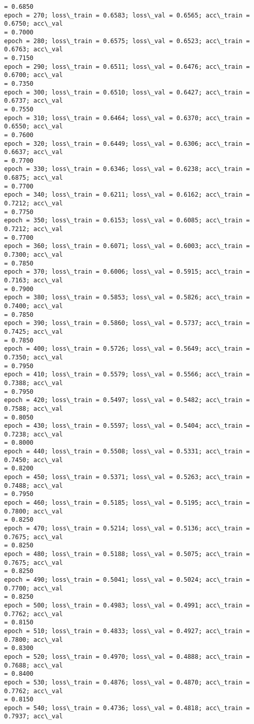 \documentclass[10pt]{article}
\begin{document}
\begin{Verbatim}[commandchars=\\\{\}]
= 0.6850
epoch = 270; loss\_train = 0.6583; loss\_val = 0.6565; acc\_train = 0.6750; acc\_val
= 0.7000
epoch = 280; loss\_train = 0.6575; loss\_val = 0.6523; acc\_train = 0.6763; acc\_val
= 0.7150
epoch = 290; loss\_train = 0.6511; loss\_val = 0.6476; acc\_train = 0.6700; acc\_val
= 0.7350
epoch = 300; loss\_train = 0.6510; loss\_val = 0.6427; acc\_train = 0.6737; acc\_val
= 0.7550
epoch = 310; loss\_train = 0.6464; loss\_val = 0.6370; acc\_train = 0.6550; acc\_val
= 0.7600
epoch = 320; loss\_train = 0.6449; loss\_val = 0.6306; acc\_train = 0.6637; acc\_val
= 0.7700
epoch = 330; loss\_train = 0.6346; loss\_val = 0.6238; acc\_train = 0.6875; acc\_val
= 0.7700
epoch = 340; loss\_train = 0.6211; loss\_val = 0.6162; acc\_train = 0.7212; acc\_val
= 0.7750
epoch = 350; loss\_train = 0.6153; loss\_val = 0.6085; acc\_train = 0.7212; acc\_val
= 0.7700
epoch = 360; loss\_train = 0.6071; loss\_val = 0.6003; acc\_train = 0.7300; acc\_val
= 0.7850
epoch = 370; loss\_train = 0.6006; loss\_val = 0.5915; acc\_train = 0.7163; acc\_val
= 0.7900
epoch = 380; loss\_train = 0.5853; loss\_val = 0.5826; acc\_train = 0.7400; acc\_val
= 0.7850
epoch = 390; loss\_train = 0.5860; loss\_val = 0.5737; acc\_train = 0.7425; acc\_val
= 0.7850
epoch = 400; loss\_train = 0.5726; loss\_val = 0.5649; acc\_train = 0.7350; acc\_val
= 0.7950
epoch = 410; loss\_train = 0.5579; loss\_val = 0.5566; acc\_train = 0.7388; acc\_val
= 0.7950
epoch = 420; loss\_train = 0.5497; loss\_val = 0.5482; acc\_train = 0.7588; acc\_val
= 0.8050
epoch = 430; loss\_train = 0.5597; loss\_val = 0.5404; acc\_train = 0.7238; acc\_val
= 0.8000
epoch = 440; loss\_train = 0.5508; loss\_val = 0.5331; acc\_train = 0.7450; acc\_val
= 0.8200
epoch = 450; loss\_train = 0.5371; loss\_val = 0.5263; acc\_train = 0.7488; acc\_val
= 0.7950
epoch = 460; loss\_train = 0.5185; loss\_val = 0.5195; acc\_train = 0.7800; acc\_val
= 0.8250
epoch = 470; loss\_train = 0.5214; loss\_val = 0.5136; acc\_train = 0.7675; acc\_val
= 0.8250
epoch = 480; loss\_train = 0.5188; loss\_val = 0.5075; acc\_train = 0.7675; acc\_val
= 0.8250
epoch = 490; loss\_train = 0.5041; loss\_val = 0.5024; acc\_train = 0.7700; acc\_val
= 0.8250
epoch = 500; loss\_train = 0.4983; loss\_val = 0.4991; acc\_train = 0.7762; acc\_val
= 0.8150
epoch = 510; loss\_train = 0.4833; loss\_val = 0.4927; acc\_train = 0.7800; acc\_val
= 0.8300
epoch = 520; loss\_train = 0.4970; loss\_val = 0.4888; acc\_train = 0.7688; acc\_val
= 0.8400
epoch = 530; loss\_train = 0.4876; loss\_val = 0.4870; acc\_train = 0.7762; acc\_val
= 0.8150
epoch = 540; loss\_train = 0.4736; loss\_val = 0.4818; acc\_train = 0.7937; acc\_val

\end{Verbatim}
\end{document}
